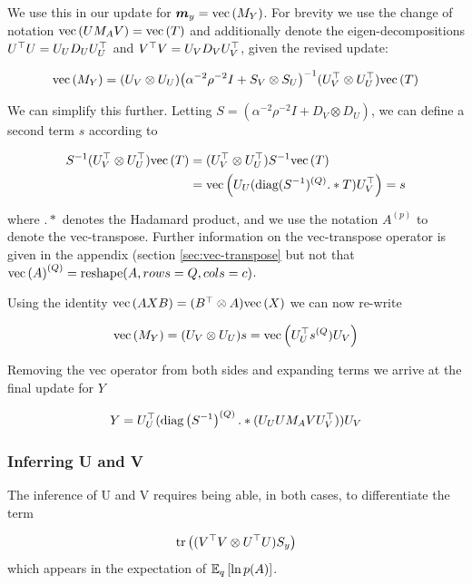 We use this in our update for $\vv{m}_y = \vecf{M_Y}$. For brevity we use the change of notation $\vecf{U M_A V} = \vecf{T}$ and additionally denote the eigen-decompositions $U\T U = U_U D_U U_U\T$ and $V\T V = U_V D_V U_V\T$, given the revised update:

\begin{align}
\vecf{M_Y} = (U_V \otimes U_U)
  \invb{\alpha^{-2}\rho^{-2} I + S_V \otimes S_U}
  (U_V^\top \otimes U_U^\top) \vecf{T}
\end{align}

We can simplify this further. Letting $S = (\alpha^{-2}\rho^{-2} I + D_V \otimes D_U)$, we can define a second term $s$ according to

\begin{align}
S^{-1}(U_V^\top \otimes U_U^\top) \vecf{T} 
& =
(U_V^\top \otimes U_U^\top)S^{-1} \vecf{T} \\
& =
\vecf{U_U (\text{diag}(S^{-1})^{(Q)} .* T) U_V^\top} = s
\end{align}

where $.*$ denotes the Hadamard product, and we use the notation $A^{(p)}$ to denote the vec-transpose\cite{Minka2000a}. Further information on the vec-transpose operator is given in the appendix (section \ref{sec:vec-transpose} but not that $\vecf{A}^{(Q)} = \text{reshape}(A, rows=Q, cols=c)$.

Using the identity $\vecf{AXB} = (B\T \otimes A)\vecf{X}$ we can now re-write

\begin{align}
\vecf{M_Y} = (U_V \otimes U_U)s = \vecf{U_U^\top s^{(Q}) U_V}
\end{align}

Removing the vec operator from both sides and expanding terms we arrive at the final update for $Y$

\begin{align}
Y = U_U^\top (\diag{\inv{S}}^{(Q)} .* (U_U U M_A V U_V^\top)) U_V
\end{align}

\subsubsection{Inferring U and V}
The inference of U and V requires being able, in both cases, to differentiate the term

\begin{align}
\Tr{(V\T V \otimes U\T U)S_y} \label{eqn:kro-deriv-input}
\end{align}
which appears in the expectation of $\ex{\ln p(A)}{q}$.

